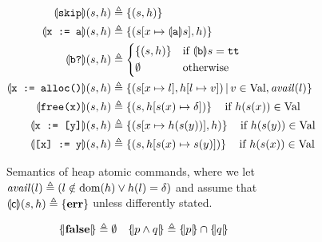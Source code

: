 \begin{figure}[t]
	\begin{subfigure}[t]{\linewidth}
		\centering
		\begin{align*}
			\edenot{\code{skip}} (s, h)         & \eqdef \{ (s, h) \}                                                                                    \\
			\edenot{\code{x := a}} (s, h)       & \eqdef \left\lbrace (s[x \mapsto \edenot{\code{a}} s], h) \right\rbrace                                \\
			\edenot{\code{b?}} (s, h)           & \eqdef \begin{cases*}
				                                             \left\lbrace (s, h) \right\rbrace & if $\edenot{\code{b}} s = \code{tt}$ \\
				                                             \emptyset                         & otherwise
			                                             \end{cases*}  \\
			\edenot{\code{x := alloc()}} (s, h) & \eqdef \left\lbrace (s[x \mapsto l], h[l \mapsto v]) \svert v \in \Val, \mathit{avail}(l)\right\rbrace \\
			\edenot{\code{free(x)}} (s, h)      & \eqdef
			\left\lbrace (s, h[s(x) \mapsto \delta]) \right\rbrace\quad \text{if}~h(s(x)) \in \Val                                                       \\
			\edenot{\code{x := [y]}} (s, h)     & \eqdef
			\left\lbrace (s[x \mapsto h(s(y))], h) \right\rbrace\quad \text{if}~h(s(y)) \in \Val                                                         \\
			\edenot{\code{[x] := y}} (s, h)     & \eqdef
			\left\lbrace (s, h[s(x) \mapsto s(y)]) \right\rbrace \quad \text{if}~h(s(x)) \in \Val
		\end{align*}
		\caption{Semantics of heap atomic commands, where we let $\mathit{avail}(l) \triangleq (l \notin \text{dom}(h) \lor h(l) = \delta)$ and assume that $\llparenthesis\mathsf{c}\rrparenthesis (s, h)\triangleq \left\lbrace \textbf{err} \right\rbrace$ unless differently stated.}
		\label{fig:sil:ssil-model-commands}
	\end{subfigure}
	\begin{subfigure}[t]{\linewidth}
		\vspace*{1ex}
		\centering
		\begin{align*}
			 & \asldenot{\false} \eqdef \emptyset                                                                                                          &  & \asldenot{p \land q} \eqdef \asldenot{p} \cap \asldenot{q}    \\

\end{align*}
\end{subfigure}
\end{figure}
